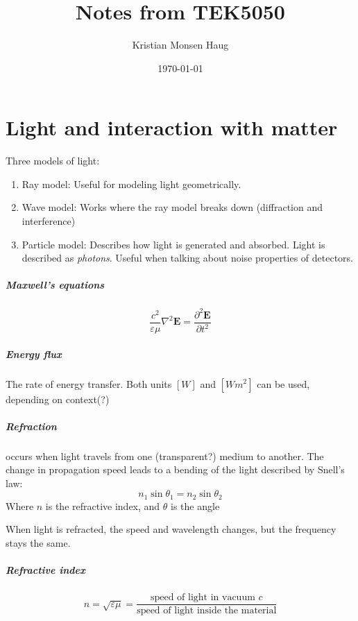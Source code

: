 \documentclass[article]{memoir}
\title{Notes from TEK5050}
\author{Kristian Monsen Haug}
\date{\today}
\begin{document}
\maketitle


\chapter{Light and interaction with matter}

Three models of light:
\begin{enumerate}
    \item Ray model: Useful for modeling light geometrically.
    \item Wave model: Works where the ray model breaks down (diffraction and interference)
    \item Particle model: Describes how light is generated and absorbed. Light is described as \emph{photons}. Useful when talking about noise properties of detectors.
\end{enumerate}

\paragraph{Maxwell's equations}
\begin{equation}
    \frac{c^2}{\varepsilon \mu} \nabla^2 \mathbf{E} = \frac{\partial^2\mathbf{E}}{\partial t^2}    
\end{equation}

\paragraph{Energy flux}
The rate of energy transfer. Both units \([W]\) and \([Wm^2]\) can be used, depending on context(?)

\paragraph{Refraction}
occurs when light travels from one (transparent?) medium to another. The change in propagation speed leads to a bending of the light described by Snell's law:
\begin{equation}
    n_1 \sin \theta_1 = n_2 \sin \theta_2
\end{equation}
Where \(n\) is the refractive index, and \(\theta\) is the angle

When light is refracted, the speed and wavelength changes, but the frequency stays the same.

\paragraph{Refractive index}
\[
    n = \sqrt{\varepsilon \mu} = \frac{\text{speed of light in vacuum } c}{\text{speed of light inside the material}}
\]
\end{document}
